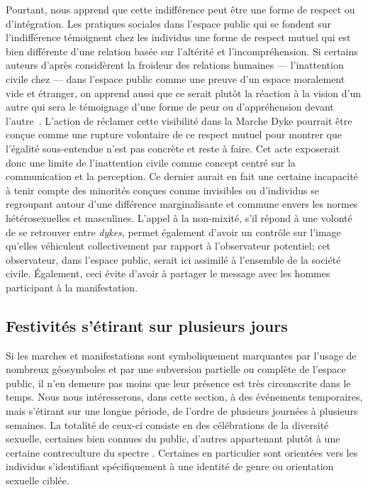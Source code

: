 Pourtant, \citeauthor{Frosh2006} nous apprend que cette indifférence peut être une forme de respect ou d'intégration.
Les pratiques sociales dans l'espace public qui se fondent sur l'indifférence témoignent chez les individus une forme de respect mutuel qui est bien différente d'une relation basée sur l'altérité et l'incompréhension.
Si certains auteurs d'après \citeauthor{Frosh2006} considèrent la froideur des relations humaines --- l'inattention civile chez \citeauthor{Goffman1956} --- dans l'espace public comme une preuve d'un espace moralement vide et étranger, on apprend aussi que ce serait plutôt la réaction à la vision d'un autre qui sera le témoignage d'une forme de peur ou d'appréhension devant l'autre~\citep[279--280]{Frosh2006}.
L'action de réclamer cette visibilité dans la Marche Dyke pourrait être conçue comme une rupture volontaire de ce respect mutuel pour montrer que l'égalité sous-entendue n'est pas concrète et reste à faire.
Cet acte exposerait donc une limite de l'inattention civile comme concept centré sur la communication et la perception.
Ce dernier aurait en fait une certaine incapacité à tenir compte des minorités conçues comme invisibles ou d'individus se regroupant autour d'une différence marginalisante et commune envers les normes hétérosexuelles et masculines.
L'appel à la non-mixité, s'il répond à une volonté de se retrouver entre \emph{dykes}, permet également d'avoir un contrôle sur l'image qu'elles véhiculent collectivement par rapport à l'observateur potentiel; cet observateur, dans l'espace public, serait ici assimilé à l'ensemble de la société civile.
Également, ceci évite d'avoir à partager le message avec les hommes participant à la manifestation.


\subsection{Festivités s'étirant sur plusieurs jours}
\label{sec:festivitesplusieursjours}
Si les marches et manifestations sont symboliquement marquantes par l'usage de nombreux géosymboles et par une subversion partielle ou complète de l'espace public, il n’en demeure pas moins que leur présence est très circonscrite dans le temps.
Nous nous intéresserons, dans cette section, à des événements temporaires, mais s'étirant sur une longue période, de l'ordre de plusieurs journées à plusieurs semaines.
La totalité de ceux-ci consiste en des célébrations de la diversité sexuelle, certaines bien connues du public, d'autres appartenant plutôt à une certaine contreculture du spectre \lgbt.
Certaines en particulier sont orientées vers les individus s'identifiant spécifiquement à une identité de genre ou orientation sexuelle ciblée.

